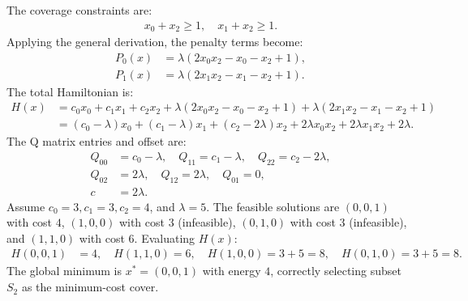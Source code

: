 \documentclass[12pt]{article}
\begin{document}
The coverage constraints are:
\begin{align}
x_0 + x_2 \ge 1, \quad x_1 + x_2 \ge 1.
\end{align}
Applying the general derivation, the penalty terms become:
\begin{align}
P_0(x) &= \lambda(2x_0 x_2 - x_0 - x_2 + 1), \\
P_1(x) &= \lambda(2x_1 x_2 - x_1 - x_2 + 1).
\end{align}
The total Hamiltonian is:
\begin{align}
H(x) &= c_0 x_0 + c_1 x_1 + c_2 x_2 + \lambda(2x_0 x_2 - x_0 - x_2 + 1) + \lambda(2x_1 x_2 - x_1 - x_2 + 1) \nonumber \\
&= (c_0 - \lambda)x_0 + (c_1 - \lambda)x_1 + (c_2 - 2\lambda)x_2 + 2\lambda x_0 x_2 + 2\lambda x_1 x_2 + 2\lambda.
\end{align}
The Q matrix entries and offset are:
\begin{align}
Q_{00} &= c_0 - \lambda, \quad Q_{11} = c_1 - \lambda, \quad Q_{22} = c_2 - 2\lambda, \nonumber \\
Q_{02} &= 2\lambda, \quad Q_{12} = 2\lambda, \quad Q_{01} = 0, \nonumber \\
c &= 2\lambda.
\end{align}
Assume $c_0 = 3, c_1 = 3, c_2 = 4$, and $\lambda = 5$. The feasible solutions are $(0,0,1)$ with cost $4$, $(1,0,0)$ with cost $3$ (infeasible), $(0,1,0)$ with cost $3$ (infeasible), and $(1,1,0)$ with cost $6$. Evaluating $H(x)$:
\begin{align}
H(0,0,1) &= 4, \quad H(1,1,0) = 6, \quad H(1,0,0) = 3 + 5 = 8, \quad H(0,1,0) = 3 + 5 = 8.
\end{align}
The global minimum is $x^* = (0,0,1)$ with energy $4$, correctly selecting subset $S_2$ as the minimum-cost cover.
\end{document}
